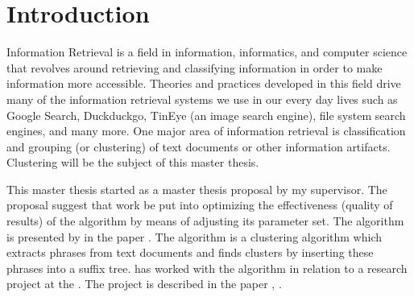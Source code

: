 
\chapter{Introduction} %

\label{Introduction}



Information Retrieval is a field in information, informatics, and computer science that revolves around retrieving and classifying information in order to make information more accessible. Theories and practices developed in this field drive many of the information retrieval systems we use in our every day lives such as Google Search, Duckduckgo, TinEye (an image search engine), file system search engines, and many more. One major area of information retrieval is classification and grouping (or clustering) of text documents or other information artifacts. Clustering will be the subject of this master thesis.

This master thesis started as a master thesis proposal by my supervisor. The proposal suggest that work be put into optimizing the effectiveness (quality of results) of the \STC algorithm by means of adjusting its parameter set. The \STC algorithm is presented by \textcite{Oren1998} in the paper . The algorithm is a clustering algorithm which extracts phrases from text documents and finds clusters by inserting these phrases into a suffix tree. \cite{Moe2013} has worked with the \STC algorithm in relation to a research project at the \deptname. The project is described in the paper , \cite{Elgesem2009}.

